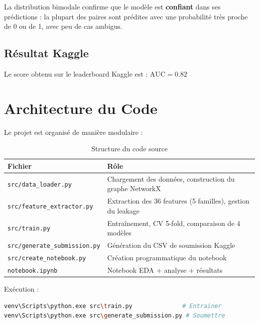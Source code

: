 \documentclass[12pt,a4paper]{article}
\begin{document}
La distribution bimodale confirme que le modèle est \textbf{confiant} dans ses prédictions : la plupart des paires sont prédites avec une probabilité très proche de 0 ou de 1, avec peu de cas ambigus.

\subsection{Résultat Kaggle}

Le score obtenu sur le leaderboard Kaggle est : $\boxed{\text{AUC} = 0.82}$

\section{Architecture du Code}

Le projet est organisé de manière modulaire :

\begin{table}[H]
\centering
\small
\begin{tabular}{p{5cm}p{8cm}}
\toprule
\textbf{Fichier} & \textbf{Rôle} \\
\midrule
\texttt{src/data\_loader.py} & Chargement des données, construction du graphe NetworkX \\
\texttt{src/feature\_extractor.py} & Extraction des 36 features (5 familles), gestion du leakage \\
\texttt{src/train.py} & Entraînement, CV 5-fold, comparaison de 4 modèles \\
\texttt{src/generate\_submission.py} & Génération du CSV de soumission Kaggle \\
\texttt{src/create\_notebook.py} & Création programmatique du notebook \\
\texttt{notebook.ipynb} & Notebook EDA + analyse + résultats \\
\bottomrule
\end{tabular}
\caption{Structure du code source}
\end{table}

Exécution :
\begin{lstlisting}[language=bash]
venv\Scripts\python.exe src\train.py              # Entrainer
venv\Scripts\python.exe src\generate_submission.py # Soumettre
\end{lstlisting}

\end{document}
